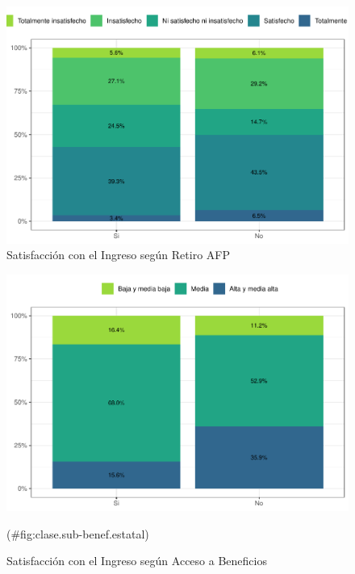 \documentclass[
  12pt,
]{book}
\begin{document}
\begin{figure}

{\centering \includegraphics{reporte-elsoc_files/figure-latex/satisfaccion-retiro-1} 

}

\caption{Satisfacción con el Ingreso según Retiro AFP}\label{fig:satisfaccion-retiro}
\end{figure}

\begin{figure}

{\centering \includegraphics{reporte-elsoc_files/figure-latex/clase.sub-benef.estatal-1} 

}

\caption{Satisfacción con el Ingreso según Acceso a Beneficios}(\#fig:clase.sub-benef.estatal)
\end{figure}
\end{document}
